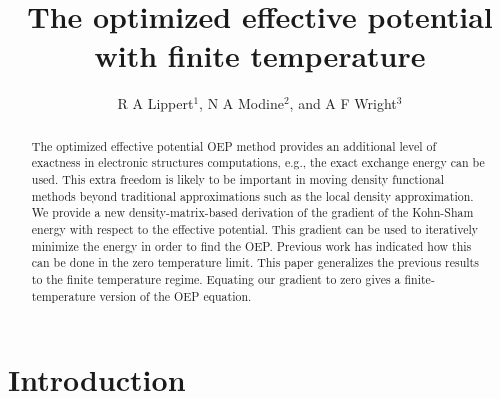 \documentclass[12pt]{iopart}
\begin{document}
\title{The optimized effective potential with finite temperature}

\author{R A Lippert$^1$, N A Modine$^2$, and A F Wright$^3$}

\address{$^1$
           MIT Department of Mathematics,
           77 Massachusetts Avenue,
           Cambridge, MA 02139-4307 USA.
}
\address{$^{2,3}$
Sandia National Laboratories,
P.O. Box 5800,
Albuquerque, New Mexico 87185-0601 USA
}

\begin{abstract}
The optimized effective potential OEP method provides an additional level
of exactness in electronic structures computations, e.g., the exact
exchange energy can be used.  This extra freedom is likely to be
important in moving density functional methods beyond traditional
approximations such as the local density approximation.  We provide
a new density-matrix-based derivation of the gradient of the Kohn-Sham
energy with respect to the effective potential.  This gradient can be
used to iteratively minimize the energy in order to find the OEP.
Previous work has indicated how this can be done in the zero temperature
limit.  This paper generalizes the previous results to the finite
temperature regime.  Equating our gradient to zero gives a finite-temperature
version of the OEP equation.
\end{abstract}

\submitto{\JPCM}


\maketitle


\section{Introduction}
\end{document}
